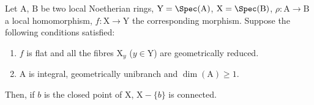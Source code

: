 \begin{lemma}[18.9.7.3]
\label{IV.18.9.7.3}
Let $\mathrm{A}$, $\mathrm{B}$ be two local Noetherian rings, $\mathrm{Y}=\Spec(\mathrm{A})$, $\mathrm{X}=\Spec(\mathrm{B})$, $\rho:\mathrm{A}\to\mathrm{B}$ a local homomorphism, $f:\mathrm{X}\to\mathrm{Y}$ the corresponding morphism.
Suppose the following conditions satisfied:
\begin{enumerate}[label=\emph{\roman*)}]
  \item $f$ is flat and all the fibres $\mathrm{X}_y$ ($y\in\mathrm{Y}$) are geometrically reduced.
  \item A is integral, geometrically unibranch and $\dim(\mathrm{A})\geq 1$.
\end{enumerate}
Then, if $b$ is the closed point of $\mathrm{X}$, $\mathrm{X}-\{b\}$ is connected.
\end{lemma}

